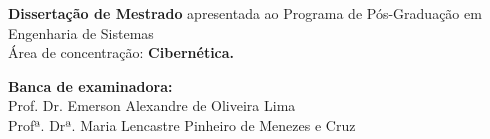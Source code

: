 \begin{center}
\begin{center}
\end{center}


\begin{flushright}
\vspace{0.5in}
\parbox{3.15in}
 {\textbf{Dissertação de Mestrado} apresentada ao Programa de Pós-Graduação em Engenharia de Sistemas\\
 Área de concentração: \textbf{Cibernética.} }
\end{flushright}



\vspace{0.5in}

\begin{flushleft}

\vspace{1ex} \textbf{Banca de examinadora:} \\

\vspace{1ex} Prof. Dr. Emerson Alexandre de Oliveira Lima \\
Profª. Drª. Maria Lencastre Pinheiro de Menezes e Cruz \\

\end{flushleft}


\vspace{0.2in}
\dataQualif

\end{center}

